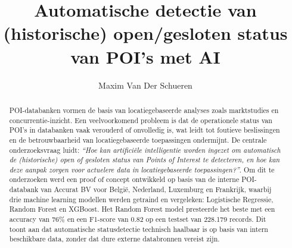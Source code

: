 \documentclass[a0,portrait]{hogent-poster}
\title{Automatische detectie van (historische) open/gesloten status van POI’s met AI}
\author{Maxim Van Der Schueren}
\begin{document}
\maketitle
\begin{abstract}
POI-databanken vormen de basis van locatiegebaseerde analyses zoals marktstudies en concurrentie-inzicht. Een veelvoorkomend probleem is dat de operationele status van POI's in databanken vaak verouderd of onvolledig is, wat leidt tot foutieve beslissingen en de betrouwbaarheid van locatiegebaseerde toepassingen ondermijnt. De centrale onderzoeksvraag luidt: \textit{``Hoe kan artificiële intelligentie worden ingezet om automatisch de (historische) open of gesloten status van Points of Interest te detecteren, en hoe kan deze aanpak zorgen voor actuelere data in locatiegebaseerde toepassingen?''}. Om dit te onderzoeken werd een proof of concept ontwikkeld op basis van de interne POI-databank van Accurat BV voor België, Nederland, Luxemburg en Frankrijk, waarbij drie machine learning modellen werden getraind en vergeleken: Logistische Regressie, Random Forest en XGBoost. Het Random Forest model presteerde het beste met een accuracy van 76\% en een F1-score van 0.82 op een testset van 228.179 records. Dit toont aan dat automatische statusdetectie technisch haalbaar is op basis van intern beschikbare data, zonder dat dure externe databronnen vereist zijn.
\end{abstract}
\end{document}
